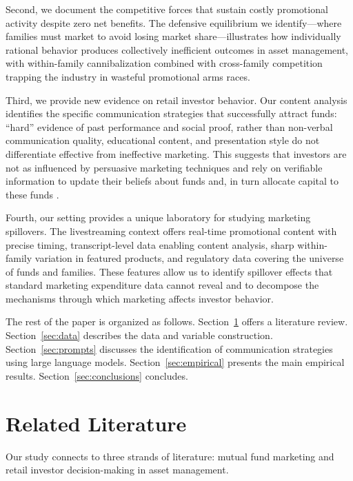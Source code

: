 \documentclass[12pt]{article}
\begin{document}
Second, we document the competitive forces that sustain costly promotional activity despite zero net benefits. The defensive equilibrium we identify—where families must market to avoid losing market share—illustrates how individually rational behavior produces collectively inefficient outcomes in asset management, with within-family cannibalization combined with cross-family competition trapping the industry in wasteful promotional arms races.

Third, we provide new evidence on retail investor behavior. Our content analysis identifies the specific communication strategies that successfully attract funds: ``hard'' evidence of past performance and social proof, rather than non-verbal communication quality, educational content, and presentation style do not differentiate effective from ineffective marketing. This suggests that investors are not as influenced by persuasive marketing techniques and rely on verifiable information to update their beliefs about funds and, in turn allocate capital to these funds \citep{berk2004mutual}.

Fourth, our setting provides a unique laboratory for studying marketing spillovers. The livestreaming context offers real-time promotional content with precise timing, transcript-level data enabling content analysis, sharp within-family variation in featured products, and regulatory data covering the universe of funds and families. These features allow us to identify spillover effects that standard marketing expenditure data cannot reveal and to decompose the mechanisms through which marketing affects investor behavior.

The rest of the paper is organized as follows. Section~\ref{sec:literature} offers a literature review. Section~\ref{sec:data} describes the data and variable construction. Section~\ref{sec:prompts} discusses the identification of communication strategies using large language models. Section~\ref{sec:empirical} presents the main empirical results. Section~\ref{sec:conclusions} concludes.

\section{Related Literature}\label{sec:literature}

Our study connects to three strands of literature: mutual fund marketing and retail investor decision-making in asset management.

\end{document}
